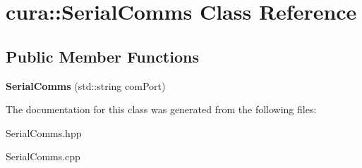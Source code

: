 \hypertarget{classcura_1_1_serial_comms}{}\section{cura\+:\+:Serial\+Comms Class Reference}
\label{classcura_1_1_serial_comms}
\subsection*{Public Member Functions}
\begin{DoxyCompactItemize}
\item 
\mbox{\label{classcura_1_1_serial_comms_ae18f65d33108139124c5d7226102b9e3}} 
{\bfseries Serial\+Comms} (std\+::string com\+Port)
\end{DoxyCompactItemize}


The documentation for this class was generated from the following files\+:\begin{DoxyCompactItemize}
\item 
Serial\+Comms.\+hpp\item 
Serial\+Comms.\+cpp\end{DoxyCompactItemize}

